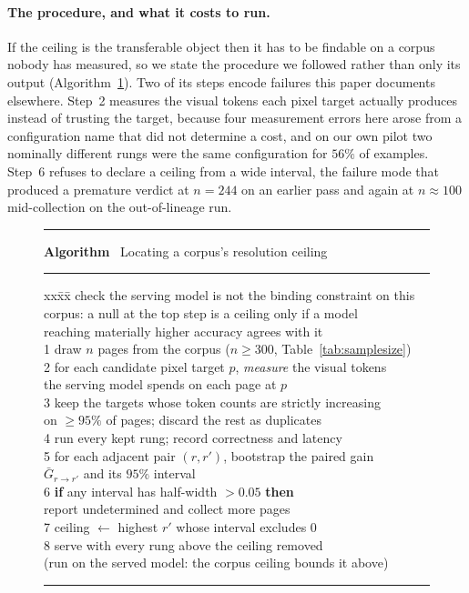 \documentclass[10pt,twocolumn]{article}
\theoremstyle{plain}
\newcounter{algorithm}
\renewcommand{\thealgorithm}{\arabic{algorithm}}
\newenvironment{algorithm}[1][t]%
  {\begin{figure}[#1]\small\hrule\vspace{2pt}}%
  {\vspace{-4pt}\hrule\end{figure}}
\newcommand{\algcaption}[1]{%
  \refstepcounter{algorithm}%
  \textbf{Algorithm \thealgorithm}\ #1\vspace{1pt}\hrule\vspace{3pt}}
\begin{document}
\paragraph{The procedure, and what it costs to run.} If the ceiling is the
transferable object then it has to be findable on a corpus nobody has measured,
so we state the procedure we followed rather than only its output
(Algorithm~\ref{alg:ceiling}). Two of its steps encode failures this paper documents
elsewhere. Step~2 measures the visual tokens each pixel target actually
produces instead of trusting the target, because four measurement errors here
arose from a configuration name that did not determine a cost, and on our own
pilot two nominally different rungs were the same configuration for $56\%$ of
examples. Step~6 refuses to declare a ceiling from a wide interval, the failure
mode that produced a premature verdict at $n=244$ on an earlier pass and again
at $n \approx 100$ mid-collection on the out-of-lineage run.

\begin{algorithm}[t]
\small
\algcaption{Locating a corpus's resolution ceiling}\label{alg:ceiling}
\begin{tabbing}
xx\=xx\=\> check the serving model is not the binding constraint on this \\
\> corpus: a null at the top step is a ceiling only if a model \\
\> reaching materially higher accuracy agrees with it \\
1\> draw $n$ pages from the corpus ($n \geq 300$, Table~\ref{tab:samplesize}) \\
2\> for each candidate pixel target $p$, \emph{measure} the visual tokens \\
\> the serving model spends on each page at $p$ \\
3\> keep the targets whose token counts are strictly increasing \\
\> on $\geq 95\%$ of pages; discard the rest as duplicates \\
4\> run every kept rung; record correctness and latency \\
5\> for each adjacent pair $(r, r')$, bootstrap the paired gain \\
\> $\bar G_{r \to r'}$ and its $95\%$ interval \\
6\> \textbf{if} any interval has half-width $> 0.05$ \textbf{then} \\
\> report undetermined and collect more pages \\
7\> ceiling $\leftarrow$ highest $r'$ whose interval excludes $0$ \\
8\> serve with every rung above the ceiling removed \\
\> (run on the served model: the corpus ceiling bounds it above)
\end{tabbing}
\end{algorithm}
\end{document}
